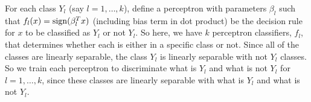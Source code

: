 \tftrue

For each class $Y_l$ (say $l = 1, \dots, k$), define a perceptron with parameters $\beta_l$ such that 
$f_l(x) = \operatorname{sign}(\beta_l^T x)$ (including bias term in dot product) be the decision rule for $x$ to be classified as $Y_l$ or not $Y_l$. So here, we have $k$ perceptron classifiers, $f_l$, that determines whether each is either in a specific class or not. Since all of the classes are linearly separable, the class $Y_l$ is linearly separable with not $Y_l$ classes. So we train each perceptron to discriminate what is $Y_l$ and what is not $Y_l$ for $l = 1, \dots, k$, since these classes are linearly separable with what is $Y_l$ and what is not $Y_l$. 